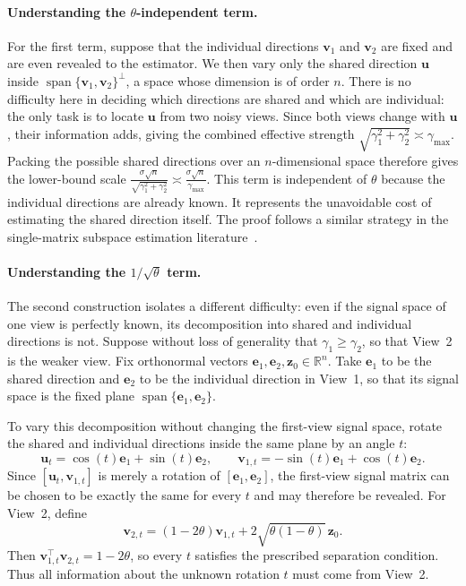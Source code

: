 \documentclass[11pt]{article}
\newcommand{\trans}{\top}
\begin{document}
\paragraph{Understanding the $\theta$-independent term.}
For the first term, suppose that the individual directions $\bm v_1$ and
$\bm v_2$ are fixed and are even revealed to the estimator.  We then vary only
the shared direction $\bm u$ inside
$\operatorname{span}\{\bm v_1,\bm v_2\}^{\perp}$, a space whose
dimension is of order $n$.  There is no difficulty here in deciding which
directions are shared and which are individual: the only task is to locate
$\bm u$ from two noisy views.  Since both views change with $\bm u$, their
information adds, giving the combined effective strength
$\sqrt{\gamma_1^2+\gamma_2^2}\asymp\gamma_{\max}$.  Packing the possible
shared directions over an $n$-dimensional space therefore gives the lower-bound
scale $\frac{\sigma\sqrt n}
       {\sqrt{\gamma_1^2+\gamma_2^2}}
  \asymp
  \frac{\sigma\sqrt n}{\gamma_{\max}}.$ 
This term is independent of $\theta$ because the individual directions are
already known.  It represents the unavoidable cost of estimating the
shared direction itself. 
The proof follows a similar strategy in the single-matrix subspace estimation literature~\citep{Cai2021Unbalanced}.




\paragraph{Understanding the $1/\sqrt{\theta}$ term.}
The second construction isolates a different difficulty: even if the signal
space of one view is perfectly known, its decomposition into shared and
individual directions is not. Suppose without loss of generality that
$\gamma_1\ge\gamma_2$, so that View~2 is the weaker view. Fix orthonormal
vectors $\bm e_1,\bm e_2,\bm z_0\in\mathbb R^n$. Take
$\bm e_1$ to be the shared direction and $\bm e_2$ to be the individual
direction in View~1, so that its signal space is the fixed plane
$\operatorname{span}\{\bm e_1,\bm e_2\}$.

To vary this decomposition without changing the first-view signal space,
rotate the shared and individual directions inside the same plane by an angle $t$:
\begin{equation}
\label{eq:lower-rotation-path}
  \bm u_t
  =
  \cos(t)\bm e_1+\sin(t)\bm e_2,
  \qquad
  \bm v_{1,t}
  =
  -\sin(t)\bm e_1+\cos(t)\bm e_2.
\end{equation}
Since $[\bm u_t,\bm v_{1,t}]$ is merely a rotation of
$[\bm e_1,\bm e_2]$, the first-view signal matrix can be chosen to be exactly
the same for every $t$ and may therefore be revealed. For View~2, define
\[
  \bm v_{2,t}
  =
  (1-2\theta)\bm v_{1,t}
  +
  2\sqrt{\theta(1-\theta)}\,\bm z_0.
\]
Then
$\bm v_{1,t}^\trans\bm v_{2,t}=1-2\theta$, so every $t$ satisfies
the prescribed separation condition. Thus all information about the unknown
rotation $t$ must come from View~2.
\end{document}
